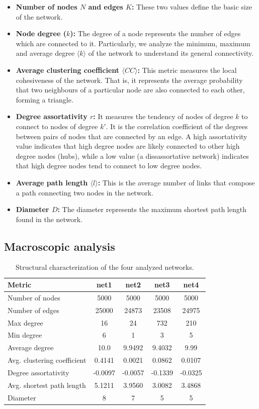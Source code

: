 \documentclass{article}
\begin{document}
\begin{itemize}
    \item \textbf{Number of nodes $N$ and edges $K$:} These two values define the basic size of the network.
    \item \textbf{Node degree ($k$):} The degree of a node represents the number of edges which are connected to it. Particularly, we analyze the minimum, maximum and average degree $\langle k \rangle$ of the network to understand its general connectivity.
    \item \textbf{Average clustering coefficient $\langle CC \rangle$:} This metric measures the local cohesiveness of the network. That is, it represents the average probability that two neighbours of a particular node are also connected to each other, forming a triangle. 
    \item \textbf{Degree assortativity $r$:} It measures the tendency of nodes of degree $k$ to connect to nodes of degree $k'$. It is the correlation coefficient of the degrees between pairs of nodes that are connected by an edge. A high assortativity value indicates that high degree nodes are likely connected to other high degree nodes (hubs), while a low value (a dissassortative network) indicates that high degree nodes tend to connect to low degree nodes.
    \item \textbf{Average path length $\langle l \rangle$:} This is the average number of links that compose a path connecting two nodes in the network.
    \item \textbf{Diameter $D$:} The diameter represents the maximum shortest path length found in the network.
\end{itemize}

\subsection{Macroscopic analysis}


\begin{table}[h]
\centering
\begin{tabular}{lcccc}
\toprule
\textbf{Metric} & \textbf{net1} & \textbf{net2} & \textbf{net3} & \textbf{net4} \\
\midrule
Number of nodes & 5000 & 5000 & 5000 & 5000 \\
Number of edges & 25000 & 24873 & 23508 & 24975 \\
Max degree & 16 & 24 & 732 & 210 \\
Min degree & 6 & 1 & 3 & 5 \\
Average degree & 10.0 & 9.9492 & 9.4032 & 9.99 \\
Avg. clustering coefficient & 0.4141 & 0.0021 & 0.0862 & 0.0107 \\
Degree assortativity & -0.0097 & -0.0057 & -0.1339 & -0.0325 \\
Avg. shortest path length & 5.1211 & 3.9560 & 3.0082 & 3.4868 \\
Diameter & 8 & 7 & 5 & 5 \\
\bottomrule
\end{tabular}
\caption{Structural characterization of the four analyzed networks.}
\label{tab:network_characterization}
\end{table}
\end{document}
